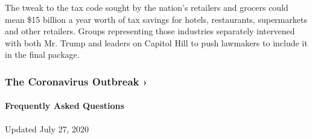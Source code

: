 The tweak to the tax code sought by the nation's retailers and grocers
could mean \$15 billion a year worth of tax savings for hotels,
restaurants, supermarkets and other retailers. Groups representing those
industries separately intervened with both Mr. Trump and leaders on
Capitol Hill to push lawmakers to include it in the final package.

\href{https://www.nytimes.com/news-event/coronavirus?action=click\&pgtype=Article\&state=default\&region=MAIN_CONTENT_3\&context=storylines_faq}{}

\hypertarget{the-coronavirus-outbreak-}{%
\subsubsection{The Coronavirus Outbreak
›}\label{the-coronavirus-outbreak-}}

\hypertarget{frequently-asked-questions}{%
\paragraph{Frequently Asked
Questions}\label{frequently-asked-questions}}

Updated July 27, 2020

